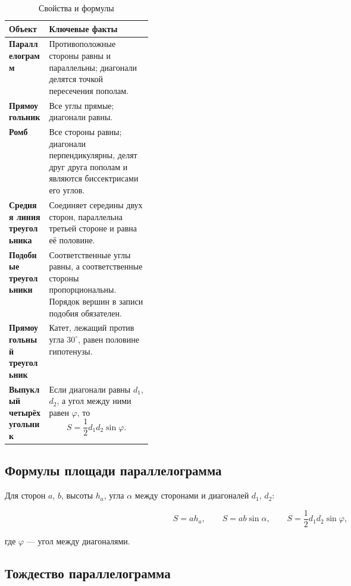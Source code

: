 \documentclass[a4paper,12pt]{article}
\begin{document}
\begin{table}[ht]
\centering
\caption{Свойства и формулы}
\renewcommand{\arraystretch}{1.35}
\begin{tabularx}{\linewidth}{>{\bfseries}p{0.28\linewidth}X}
\toprule
Объект & Ключевые факты \\
\midrule
Параллелограмм &
Противоположные стороны равны и параллельны; диагонали делятся точкой пересечения пополам. \\

Прямоугольник &
Все углы прямые; диагонали равны. \\

Ромб &
Все стороны равны; диагонали перпендикулярны, делят друг друга пополам и являются биссектрисами его углов. \\

Средняя линия треугольника &
Соединяет середины двух сторон, параллельна третьей стороне и равна её половине. \\

Подобные треугольники &
Соответственные углы равны, а соответственные стороны пропорциональны. Порядок вершин в записи подобия обязателен. \\

Прямоугольный треугольник &
Катет, лежащий против угла $30^\circ$, равен половине гипотенузы. \\

Выпуклый четырёхугольник &
Если диагонали равны $d_1$, $d_2$, а угол между ними равен $\varphi$, то
\[
S=\frac12 d_1d_2\sin\varphi.
\] \\
\bottomrule
\end{tabularx}
\end{table}

\subsection*{\color{darkaccent}Формулы площади параллелограмма}

Для сторон $a$, $b$, высоты $h_a$, угла $\alpha$ между сторонами и диагоналей $d_1$, $d_2$:

\[
S=ah_a,
\qquad
S=ab\sin\alpha,
\qquad
S=\frac12 d_1d_2\sin\varphi,
\]

где $\varphi$ --- угол между диагоналями.

\subsection*{\color{darkaccent}Тождество параллелограмма}
\end{document}
